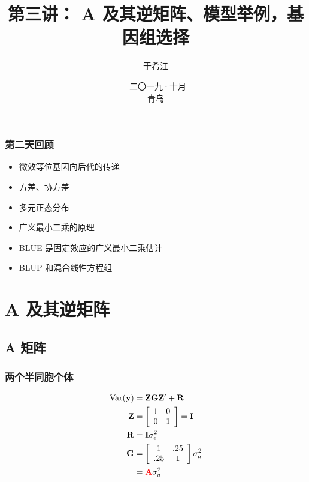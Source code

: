 \documentclass[serif,aspectratio=169]{beamer}
\begin{document}
\title{第三讲： A 及其逆矩阵、模型举例，基因组选择}
\author{于希江}
\date{\tiny{~{二〇一九·十月} \\青岛}}


\begin{frame}
  \frametitle{第二天回顾}
  \begin{itemize}
  \item 微效等位基因向后代的传递
  \item 方差、协方差
  \item 多元正态分布
  \item 广义最小二乘的原理
  \item BLUE 是固定效应的广义最小二乘估计
  \item BLUP 和混合线性方程组
  \end{itemize}
\end{frame}


\frame{
  \titlepage
}


\section{A 及其逆矩阵}
\subsection{A 矩阵}
\begin{frame}
  \frametitle{两个半同胞个体}
  \begin{align*}
    \mathrm{Var}(\mathbf{y}) &= \mathbf{ZGZ'}+\mathbf{R}\\
    \mathbf{Z}&=\left[\begin{array}{cc}1&0\\0&1\end{array}\right]=\mathbf{I}\\
    \mathbf{R}&=\mathbf{I}\sigma_e^2\\
    \mathbf{G}&=\left[\begin{array}{cc}1&.25\\.25&1\end{array}\right]\sigma_a^2\\
    &={\color{red}\mathbf{A}}\sigma_a^2
  \end{align*}
\end{frame}
\end{document}
